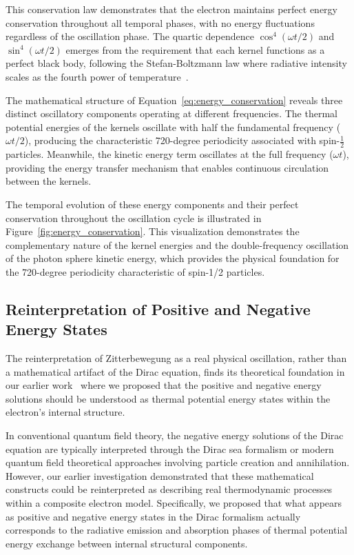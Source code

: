 \documentclass[%
 reprint,
 amsmath,amssymb,
 aps,
]{revtex4-1}
\numberwithin{equation}{section}%
\begin{document}
This conservation law demonstrates that the electron maintains perfect energy conservation throughout all temporal phases, with no energy fluctuations regardless of the oscillation phase. The quartic dependence $\cos^4(\omega t/2)$ and $\sin^4(\omega t/2)$ emerges from the requirement that each kernel functions as a perfect black body, following the Stefan-Boltzmann law where radiative intensity scales as the fourth power of temperature~\cite{hanamura2501.0130}.

The mathematical structure of Equation~\eqref{eq:energy_conservation} reveals three distinct oscillatory components operating at different frequencies. The thermal potential energies of the kernels oscillate with half the fundamental frequency ($\omega t/2$), producing the characteristic 720-degree periodicity associated with spin-$\frac{1}{2}$ particles. Meanwhile, the kinetic energy term oscillates at the full frequency ($\omega t$), providing the energy transfer mechanism that enables continuous circulation between the kernels.

The temporal evolution of these energy components and their perfect conservation throughout the oscillation cycle is illustrated in Figure~\ref{fig:energy_conservation}. This visualization demonstrates the complementary nature of the kernel energies and the double-frequency oscillation of the photon sphere kinetic energy, which provides the physical foundation for the 720-degree periodicity characteristic of spin-1/2 particles.


\subsection{Reinterpretation of Positive and Negative Energy States} \label{subsec:reinterpretation_positive}

The reinterpretation of Zitterbewegung as a real physical oscillation, rather than a mathematical artifact of the Dirac equation, finds its theoretical foundation in our earlier work~\cite{hanamura2006.0104} where we proposed that the positive and negative energy solutions should be understood as thermal potential energy states within the electron's internal structure.

In conventional quantum field theory, the negative energy solutions of the Dirac equation are typically interpreted through the Dirac sea formalism or modern quantum field theoretical approaches involving particle creation and annihilation. However, our earlier investigation demonstrated that these mathematical constructs could be reinterpreted as describing real thermodynamic processes within a composite electron model. Specifically, we proposed that what appears as positive and negative energy states in the Dirac formalism actually corresponds to the radiative emission and absorption phases of thermal potential energy exchange between internal structural components.
\end{document}
